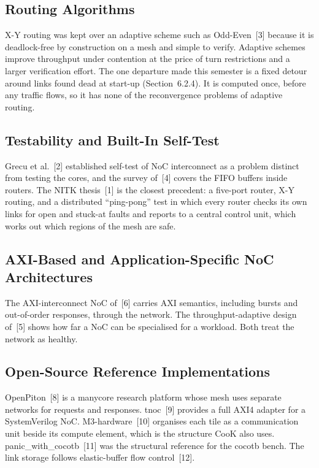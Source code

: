 \documentclass[11pt,a4paper]{article}
\begin{document}
\subsection{Routing Algorithms}

X-Y routing was kept over an adaptive scheme such as Odd-Even~[3] because it
is deadlock-free by construction on a mesh and simple to verify. Adaptive
schemes improve throughput under contention at the price of turn restrictions
and a larger verification effort. The one departure made this semester is a
fixed detour around links found dead at start-up (Section~6.2.4). It is
computed once, before any traffic flows, so it has none of the reconvergence
problems of adaptive routing.

\subsection{Testability and Built-In Self-Test}

Grecu et al.~[2] established self-test of NoC interconnect as a problem
distinct from testing the cores, and the survey of~[4] covers the FIFO buffers
inside routers. The NITK thesis~[1] is the closest precedent: a five-port
router, X-Y routing, and a distributed ``ping-pong'' test in which every
router checks its own links for open and stuck-at faults and reports to a
central control unit, which works out which regions of the mesh are safe.

\subsection{AXI-Based and Application-Specific NoC Architectures}

The AXI-interconnect NoC of~[6] carries AXI semantics, including bursts and
out-of-order responses, through the network. The throughput-adaptive design
of~[5] shows how far a NoC can be specialised for a workload. Both treat the
network as healthy.

\subsection{Open-Source Reference Implementations}

OpenPiton~[8] is a manycore research platform whose mesh uses separate
networks for requests and responses. tnoc~[9] provides a full AXI4 adapter
for a SystemVerilog NoC. M3-hardware~[10] organises each tile as a
communication unit beside its compute element, which is the structure CooK
also uses. panic\_with\_cocotb~[11] was the structural reference for the
cocotb bench. The link storage follows elastic-buffer flow control~[12].
\end{document}
